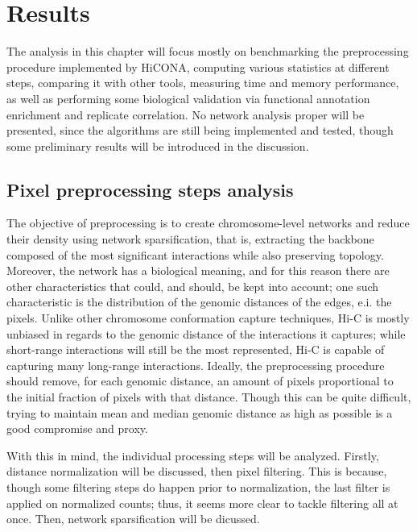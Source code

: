 \graphicspath{{chapters/05_results/images}}
\chapter{Results}


The analysis in this chapter will focus mostly on benchmarking the preprocessing procedure implemented by  HiCONA, computing various statistics at different steps, comparing it with other tools, measuring time and memory performance, as well as performing some biological validation via functional annotation enrichment and replicate correlation. No network analysis proper will be presented, since the algorithms are still being implemented and tested, though some preliminary results will be introduced in the discussion.

\section{Pixel preprocessing steps analysis}

The objective of preprocessing is to create chromosome-level networks and reduce their density using network sparsification, that is, extracting the backbone composed of the most significant interactions while also preserving topology. Moreover, the network has a biological meaning, and for this reason there are other characteristics that could, and should, be kept into account; one such characteristic is the distribution of the genomic distances of the edges, e.i. the pixels. Unlike other chromosome conformation capture techniques, Hi-C is mostly unbiased in regards to the genomic distance of the interactions it captures; while short-range interactions will still be the most represented, Hi-C is capable of capturing many long-range interactions. Ideally, the preprocessing procedure should remove, for each genomic distance, an amount of pixels proportional to the initial fraction of pixels with that distance. Though this can be quite difficult, trying to maintain mean and median genomic distance as high as possible is a good compromise and proxy. 

With this in mind, the individual processing steps will be analyzed. Firstly, distance normalization will be discussed, then pixel filtering. This is because, though some filtering steps do happen prior to normalization, the last filter is applied on normalized counts; thus, it seems more clear to tackle filtering all at once. Then, network sparsification will be dicussed. 

